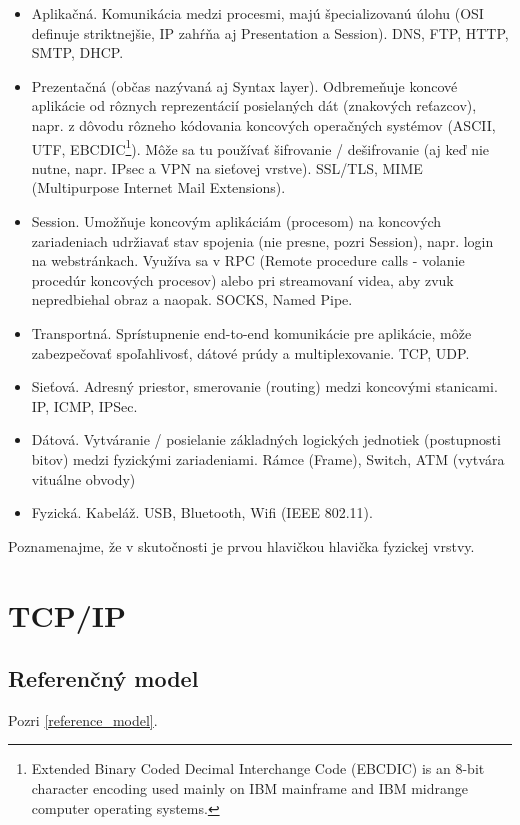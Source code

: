 \documentclass[10pt,a4paper]{article}
\begin{document}
\begin{itemize}
\item Aplikačná. Komunikácia medzi procesmi, majú špecializovanú úlohu (OSI definuje striktnejšie, IP zahŕňa aj Presentation a Session). DNS, FTP, HTTP, SMTP, DHCP. 
\item Prezentačná (občas nazývaná aj Syntax layer). Odbremeňuje koncové aplikácie od rôznych reprezentácií posielaných dát (znakových reťazcov),
napr. z dôvodu rôzneho kódovania koncových operačných systémov (ASCII, UTF, EBCDIC\footnote{
Extended Binary Coded Decimal Interchange Code (EBCDIC) is an 8-bit character encoding used mainly on IBM mainframe and IBM midrange computer operating systems.
}). Môže sa tu používať šifrovanie / dešifrovanie (aj keď nie nutne, napr. IPsec a VPN na sieťovej vrstve). SSL/TLS, MIME (Multipurpose Internet Mail Extensions).        
\item Session. Umožňuje koncovým aplikáciám (procesom) na koncových zariadeniach udržiavať stav spojenia (nie presne, pozri Session), napr. login na webstránkach. Využíva sa v RPC (Remote procedure calls - volanie procedúr koncových procesov) alebo pri streamovaní videa, aby zvuk nepredbiehal obraz a naopak. SOCKS, Named Pipe. 
\item Transportná. Sprístupnenie end-to-end komunikácie pre aplikácie, môže zabezpečovať spoľahlivosť, dátové prúdy a multiplexovanie. TCP, UDP.                    
\item Sieťová. Adresný priestor, smerovanie (routing) medzi koncovými stanicami. IP, ICMP, IPSec. 
\item Dátová. Vytváranie / posielanie základných logických jednotiek (postupnosti bitov) medzi fyzickými zariadeniami. Rámce (Frame), Switch, ATM (vytvára vituálne obvody)
\item Fyzická. Kabeláž. USB, Bluetooth, Wifi (IEEE 802.11).
\end{itemize}

Poznamenajme, že v skutočnosti je prvou hlavičkou hlavička fyzickej vrstvy. 
                  
\section{TCP/IP}    
\label{OSI}              
\subsection{Referenčný model}        
Pozri \ref{reference_model}.
\end{document}

